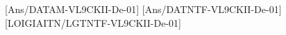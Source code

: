 %
%
%
%
[Ans/DATAM-VL9CKII-De-01]
[Ans/DATNTF-VL9CKII-De-01]
\LGexTF
{}[LOIGIAITN/LGTNTF-VL9CKII-De-01]

